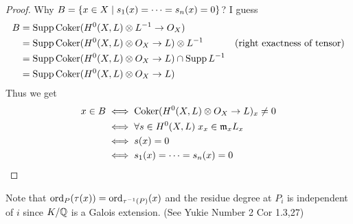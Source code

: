 \begin{proof}
  Why $B = \left\{ x \in X \mathrel{} \middle| \mathrel{} s_1(x) = \cdots = s_n(x) = 0 \right\}$? I guess
  \begin{align*}
    B &= \operatorname{Supp} \operatorname{Coker}(H^0(X,L) \otimes L^{-1} \to O_X) \\
    &= \operatorname{Supp} \operatorname{Coker}(H^0(X,L) \otimes O_X \to L) \otimes L^{-1}  &(\text{right exactness of tensor}) \\
    &= \operatorname{Supp} \operatorname{Coker}(H^0(X,L) \otimes O_X \to L) \cap \operatorname{Supp} L^{-1} \\
    &= \operatorname{Supp} \operatorname{Coker}(H^0(X,L) \otimes O_X \to L)
  \end{align*}
  Thus we get
  \begin{align*}
    x \in B &\iff \operatorname{Coker}(H^0(X,L) \otimes O_X \to L)_x \neq 0 \\
    &\iff \forall s \in H^0(X,L) \; x_x \in \mathfrak{m}_x L_x \\
    &\iff s(x) = 0 \\
    &\iff s_1(x) = \cdots = s_n(x) = 0
   \end{align*}
\end{proof}


\begin{rem}
  Note that $\operatorname{ord}_P(\tau(x)) = \operatorname{ord}_{\tau^{-1}(P)} (x)$ and the residue degree at $P_i$ is independent of $i$ since $K / {\mathbb Q}$ is a Galois extension. (See Yukie\cite{雪江N2} Number 2 Cor 1.3,27)
\end{rem}

